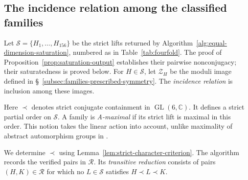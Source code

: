\documentclass[12pt]{amsart}
\numberwithin{equation}{section}
\theoremstyle{plain}
\theoremstyle{definition}
\theoremstyle{remark}
\newcommand{\CC}{\mathbb C}
\DeclareMathOperator{\GL}{GL}
\begin{document}
\subsection{The incidence relation among the classified families}
\label{subsec:fourfold-incidence}

Let $\mathscr S=\{H_1,\ldots,H_{156}\}$ be the strict lifts returned by
Algorithm~\ref{alg:equal-dimension-saturation}, numbered as in
Table~\ref{tab:fourfold}. The proof of
Proposition~\ref{prop:saturation-output} establishes their pairwise
nonconjugacy; their saturatedness is proved below.
For $H\in\mathscr S$, let $\mathcal Z_H$ be the moduli image defined in
\S~\ref{subsec:families-prescribed-symmetry}. The \emph{incidence
relation} is inclusion among these images.

Here $\prec$ denotes strict conjugate containment in $\GL(6,\CC)$.
It defines a strict partial order on $\mathscr S$. A family is
\emph{A-maximal} if its strict lift is maximal in this order. This
notion takes the linear action into account, unlike maximality of
abstract automorphism groups in \cite{yang2024automorphism}.

We determine $\prec$ using Lemma~\ref{lem:strict-character-criterion}.
The algorithm records the verified pairs in $\mathscr R$. Its
\emph{transitive reduction} consists of pairs $(H,K)\in\mathscr R$ for
which no $L\in\mathscr S$ satisfies $H\prec L\prec K$.
\end{document}
